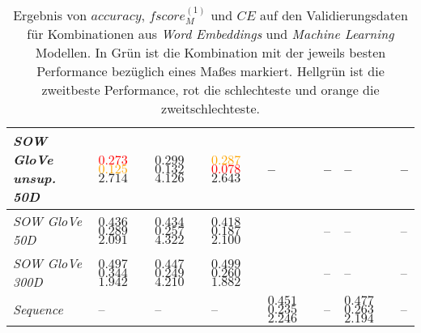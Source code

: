 \documentclass[a4paper,11pt]{article}
\begin{document}
\begin{table}[ht]
\begin{center}
\begin{tabular}{|m{2cm}||m{1.4cm}m{1.4cm}m{1.4cm}m{1.4cm}m{1.4cm}m{1.4cm}m{1.4cm}|}
 \hline
\textit{SOW GloVe unsup. 50D} & \textcolor{red}{$0.273$} \newline \textcolor{orange}{$0.125$} \newline $2.714$ & $0.299$ \newline $0.132$ \newline $4.126$ & \textcolor{orange}{$0.287$} \newline \textcolor{red}{$0.078$} \newline $2.643$ & -- & -- & -- & -- \\
 \hline
\textit{SOW GloVe 50D} & $0.436$ \newline $0.289$ \newline $2.091$ & $0.434$ \newline $0.257$ \newline $4.322$ & $0.418$ \newline $0.187$ \newline $2.100$ & & -- & -- & -- \\
 \hline
\textit{SOW GloVe 300D}  & $0.497$ \newline $0.344$ \newline $1.942$ & $0.447$ \newline $0.249$ \newline $4.210$ & $0.499$ \newline $0.260$ \newline $1.882$ & & -- & -- & -- \\
 \hline
\textit{Sequence} & -- & -- & -- & $0.451$ \newline $0.235$ \newline $2.246$ & -- & $0.477$ \newline $0.263$ \newline $2.194$ & -- \\
   \hline
\end{tabular}

  \caption{Ergebnis von $accuracy$, $fscore_M^{(1)}$ und $CE$ auf den Validierungsdaten für Kombinationen aus \textit{Word Embeddings} und \textit{Machine Learning} Modellen. In Grün ist die Kombination mit der jeweils besten Performance bezüglich eines Maßes markiert. Hellgrün ist die zweitbeste Performance, rot die schlechteste und orange die zweitschlechteste.}  
  \label{tab:preselection}
\end{center}
\end{table}
\end{document}
